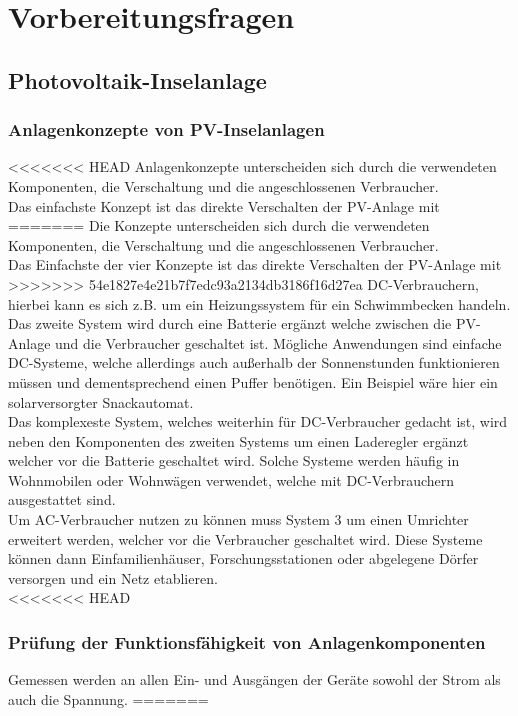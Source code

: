 \newpage
\section{Vorbereitungsfragen}
\subsection{Photovoltaik-Inselanlage}
\subsubsection{Anlagenkonzepte von PV-Inselanlagen }
<<<<<<< HEAD
Anlagenkonzepte unterscheiden sich durch die verwendeten
Komponenten, die Verschaltung und die angeschlossenen Verbraucher.\\
Das einfachste Konzept ist das direkte Verschalten der PV-Anlage mit
=======
Die Konzepte unterscheiden sich durch die verwendeten
Komponenten, die Verschaltung und die angeschlossenen Verbraucher.\\
Das Einfachste der vier Konzepte ist das direkte Verschalten der PV-Anlage mit
>>>>>>> 54e1827e4e21b7f7edc93a2134db3186f16d27ea
DC-Verbrauchern, hierbei kann es sich z.B. um ein Heizungssystem für ein Schwimmbecken handeln.\\
Das zweite System wird durch eine Batterie ergänzt welche zwischen die PV-Anlage und die Verbraucher geschaltet ist.
Mögliche Anwendungen sind einfache DC-Systeme, welche allerdings auch außerhalb der Sonnenstunden
funktionieren müssen und dementsprechend einen Puffer benötigen. Ein Beispiel wäre hier ein solarversorgter Snackautomat.\\
Das komplexeste System, welches weiterhin für DC-Verbraucher gedacht ist, wird neben den Komponenten des zweiten Systems
um einen Laderegler ergänzt welcher vor die Batterie geschaltet wird. Solche Systeme werden häufig in
Wohnmobilen oder Wohnwägen verwendet, welche mit DC-Verbrauchern ausgestattet sind.\\
Um AC-Verbraucher nutzen zu können muss System 3 um einen Umrichter erweitert werden, welcher vor die Verbraucher geschaltet wird. Diese Systeme können dann Einfamilienhäuser, Forschungsstationen oder abgelegene Dörfer versorgen und ein Netz etablieren.\\ 
<<<<<<< HEAD
\subsubsection{Prüfung der Funktionsfähigkeit von Anlagenkomponenten}
Gemessen werden an allen Ein- und Ausgängen der Geräte sowohl der Strom als auch die Spannung.
=======
